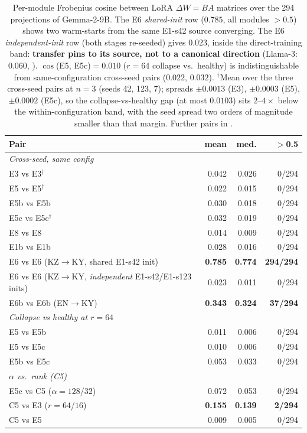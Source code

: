 \documentclass[11pt]{article}
\begin{document}
\begin{table}[!htbp]
\centering
\footnotesize
\setlength{\tabcolsep}{3pt}
\begin{tabular}{lrrr}
\toprule
\textbf{Pair} & \textbf{mean} & \textbf{med.} & \textbf{$>$0.5} \\
\midrule
\multicolumn{4}{l}{\emph{Cross-seed, same config}}\\
E3 vs E3$^{\dagger}$       & 0.042 & 0.026 & 0/294\\
E5 vs E5$^{\dagger}$       & 0.022 & 0.015 & 0/294\\
E5b vs E5b     & 0.030 & 0.018 & 0/294\\
E5c vs E5c$^{\dagger}$     & 0.032 & 0.019 & 0/294\\
E8 vs E8       & 0.014 & 0.009 & 0/294\\
E1b vs E1b     & 0.028 & 0.016 & 0/294\\
\rowcolor{gray!15} E6 vs E6 (KZ$\rightarrow$KY, shared E1-s42 init) & \textbf{0.785} & \textbf{0.774} & \textbf{294/294}\\
\rowcolor{gray!15} E6 vs E6 (KZ$\rightarrow$KY, \emph{independent} E1-s42/E1-s123 inits) & 0.023 & 0.011 & 0/294\\
\rowcolor{gray!15} E6b vs E6b (EN$\rightarrow$KY) & \textbf{0.343} & \textbf{0.324} & \textbf{37/294}\\
\midrule
\multicolumn{4}{l}{\emph{Collapse vs healthy at $r{=}64$}}\\
E5 vs E5b      & 0.011 & 0.006 & 0/294\\
E5 vs E5c      & 0.010 & 0.006 & 0/294\\
E5b vs E5c     & 0.053 & 0.033 & 0/294\\
\midrule
\multicolumn{4}{l}{\emph{$\alpha$ vs.\ rank (C5)}}\\
E5c vs C5 ($\alpha{=}128$/$32$)  & 0.072 & 0.053 & 0/294\\
C5 vs E3 ($r{=}64$/$16$)         & \textbf{0.155} & \textbf{0.139} & \textbf{2/294}\\
C5 vs E5 & 0.009 & 0.005 & 0/294\\
\bottomrule
\end{tabular}
\caption{Per-module Frobenius cosine between LoRA $\Delta W{=}BA$ matrices over the 294 projections of Gemma-2-9B. The E6 \emph{shared-init} row ($0.785$, all modules $>0.5$) shows two warm-starts from the same E1-s42 source converging. The E6 \emph{independent-init} row (both stages re-seeded) gives $0.023$, inside the direct-training band: \textbf{transfer pins to its source, not to a canonical direction} (Llama-3: $0.060$, ). $\cos$(E5, E5c)$=0.010$ ($r{=}64$ collapse vs.\ healthy) is indistinguishable from same-configuration cross-seed pairs ($0.022$, $0.032$). $^{\dagger}$Mean over the three cross-seed pairs at $n{=}3$ (seeds 42, 123, 7); spreads $\pm0.0013$ (E3), $\pm0.0003$ (E5), $\pm0.0002$ (E5c), so the collapse-vs-healthy gap (at most $0.0103$) sits $2$--$4\times$ below the within-configuration band, with the seed spread two orders of magnitude smaller than that margin. Further pairs in .}
\label{tab:pairwise_cos}
\end{table}
\end{document}
